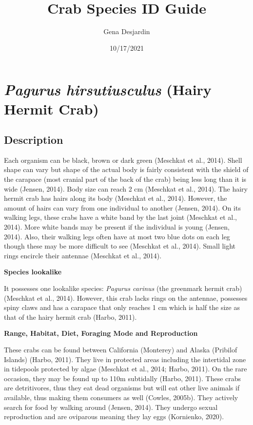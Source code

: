 \documentclass[
]{article}
\title{Crab Species ID Guide}
\author{Gena Desjardin}
\date{10/17/2021}
\begin{document}
\maketitle

\newpage

\hypertarget{pagurus-hirsutiusculus-hairy-hermit-crab}{%
\section{\texorpdfstring{\emph{Pagurus hirsutiusculus} (Hairy Hermit
Crab)}{Pagurus hirsutiusculus (Hairy Hermit Crab)}}\label{pagurus-hirsutiusculus-hairy-hermit-crab}}

\hypertarget{description}{%
\subsection{Description}\label{description}}

Each organism can be black, brown or dark green (Meschkat et al., 2014).
Shell shape can vary but shape of the actual body is fairly consistent
with the shield of the carapace (most cranial part of the back of the
crab) being less long than it is wide (Jensen, 2014). Body size can
reach 2 cm (Meschkat et al., 2014). The hairy hermit crab has hairs
along its body (Meschkat et al., 2014). However, the amount of hairs can
vary from one individual to another (Jensen, 2014). On its walking legs,
these crabs have a white band by the last joint (Meschkat et al., 2014).
More white bands may be present if the individual is young (Jensen,
2014). Also, their walking legs often have at most two blue dots on each
leg though these may be more difficult to see (Meschkat et al., 2014).
Small light rings encircle their antennae (Meschkat et al., 2014).

\textbf{Species lookalike}

It possesses one lookalike species: \emph{Pagurus carinus} (the
greenmark hermit crab) (Meschkat et al., 2014). However, this crab lacks
rings on the antennae, possesses spiny claws and has a carapace that
only reaches 1 cm which is half the size as that of the hairy hermit
crab (Harbo, 2011).

\textbf{Range, Habitat, Diet, Foraging Mode and Reproduction}

These crabs can be found between California (Monterey) and Alaska
(Pribilof Islands) (Harbo, 2011). They live in protected areas including
the intertidal zone in tidepools protected by algae (Meschkat et al.,
2014; Harbo, 2011). On the rare occasion, they may be found up to 110m
subtidally (Harbo, 2011). These crabs are detritivores, thus they eat
dead organisms but will eat other live animals if available, thus making
them consumers as well (Cowles, 2005b). They actively search for food by
walking around (Jensen, 2014). They undergo sexual reproduction and are
oviparous meaning they lay eggs (Kornienko, 2020).
\end{document}
